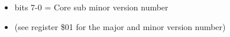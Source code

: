 \begin{itemize}
\item bits 7-0 = Core sub minor version number
\item[] (see register \$01 for the major and minor version number)
\end{itemize}

